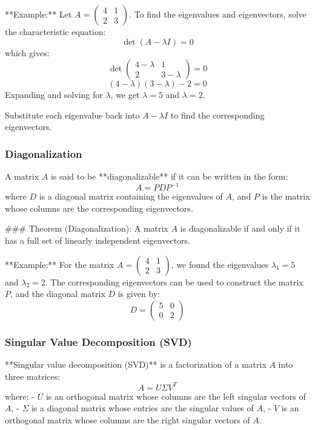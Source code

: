 \documentclass{article}
\begin{document}
**Example:**
Let \( A = \begin{pmatrix} 4 & 1 \\ 2 & 3 \end{pmatrix} \). To find the eigenvalues and eigenvectors, solve the characteristic equation:
\[
\det(A - \lambda I) = 0
\]
which gives:
\[
\det \begin{pmatrix} 4-\lambda & 1 \\ 2 & 3-\lambda \end{pmatrix} = 0
\]
\[
(4-\lambda)(3-\lambda) - 2 = 0
\]
Expanding and solving for \( \lambda \), we get \( \lambda = 5 \) and \( \lambda = 2 \).

Substitute each eigenvalue back into \( A - \lambda I \) to find the corresponding eigenvectors.

\subsubsection*{Diagonalization}

A matrix \( A \) is said to be **diagonalizable** if it can be written in the form:
\[
A = P D P^{-1}
\]
where \( D \) is a diagonal matrix containing the eigenvalues of \( A \), and \( P \) is the matrix whose columns are the corresponding eigenvectors.

### Theorem (Diagonalization):
A matrix \( A \) is diagonalizable if and only if it has a full set of linearly independent eigenvectors.

**Example:**
For the matrix \( A = \begin{pmatrix} 4 & 1 \\ 2 & 3 \end{pmatrix} \), we found the eigenvalues \( \lambda_1 = 5 \) and \( \lambda_2 = 2 \). The corresponding eigenvectors can be used to construct the matrix \( P \), and the diagonal matrix \( D \) is given by:
\[
D = \begin{pmatrix} 5 & 0 \\ 0 & 2 \end{pmatrix}
\]

\subsubsection*{Singular Value Decomposition (SVD)}

**Singular value decomposition (SVD)** is a factorization of a matrix \( A \) into three matrices:
\[
A = U \Sigma V^T
\]
where:
- \( U \) is an orthogonal matrix whose columns are the left singular vectors of \( A \),
- \( \Sigma \) is a diagonal matrix whose entries are the singular values of \( A \),
- \( V \) is an orthogonal matrix whose columns are the right singular vectors of \( A \).
\end{document}
